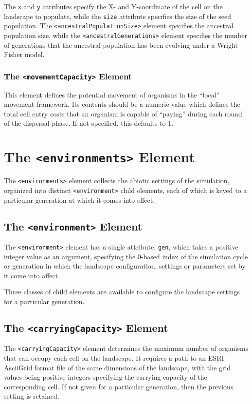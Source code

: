 \documentclass[11pt]{article}
\newcommand{\xmlelem}[1]{{\tt<\textcolor{xmlelem}{#1}>}}
\newcommand{\xmlattr}[1]{{\tt\textcolor{xmlattr}{#1}}}
\begin{document}
The \xmlattr{x} and \xmlattr{y} attributes specify the X- and Y-coordinate of the cell on the landscape to populate, while the \xmlattr{size} attribute specifies the size of the seed population.
The \xmlelem{ancestralPopulationSize} element specifies the ancestral population size, while the \xmlelem{ancestralGenerations} element specifies the number of generations that the ancestral population has been evolving under a Wright-Fisher model.

\subsubsection{The \xmlelem{movementCapacity} Element}
This element defines the potential movement of organisms in the ``local'' movement framework. Its contents should be a numeric value which defines the total cell entry costs that an organism is capable of ``paying'' during each round of the dispersal phase. If not specified, this defaults to 1.


\section{The \xmlelem{environments} Element}

The \xmlelem{environments} element collects the abiotic settings of the simulation, organized into distinct \xmlelem{environment} child elements, each of which is keyed to a particular generation at which it comes into effect.

\subsection{The \xmlelem{environment} Element}
The \xmlelem{environment} element has a single attribute, \xmlattr{gen}, which takes a positive integer value as an argument, specifying the 0-based index of the simulation cycle or generation in which the landscape configuration, settings or parameters set by it come into affect.

Three classes of child elements are available to configure the landscape settings for a particular generation.

\subsection{The \xmlelem{carryingCapacity} Element}

The \xmlelem{carryingCapacity} element determines the maximum number of organisms that can occupy each cell on the landscape. It requires a path to an ESRI AsciiGrid format file of the same dimensions of the landscape, with the grid values being positive integers specifying the carrying capacity of the corresponding cell. If not given for a particular generation, then the previous setting is retained.
\end{document}
